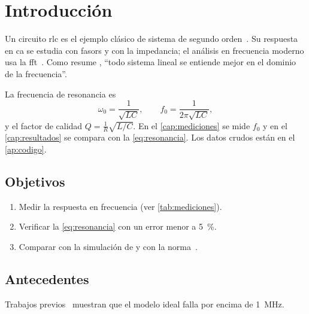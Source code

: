 \chapter{Introducción}\label{cap:intro}
Un circuito \gls{rlc} es el ejemplo clásico de sistema de segundo orden~\parencite{alexander2013,nilsson2015}.
Su respuesta en \gls{ca} se estudia con \glspl{fasor} y con la \gls{impedancia}; el análisis en
frecuencia moderno usa la \gls{fft}~\parencite{cooley1965}. Como resume \textcite{ogata2010},
\enquote{todo sistema lineal se entiende mejor en el dominio de la frecuencia}.

La frecuencia de \gls{resonancia} es
\begin{equation}\label{eq:resonancia}
  \omega_0 = \frac{1}{\sqrt{LC}}, \qquad f_0 = \frac{1}{2\pi\sqrt{LC}},
\end{equation}
%
%
%
%
y el factor de calidad $Q = \frac{1}{R}\sqrt{L/C}$. En el \cref{cap:mediciones} se mide $f_0$ y en el
\cref{cap:resultados} se compara con la \cref{eq:resonancia}. Los datos crudos están en el
\cref{ap:codigo}.

\section{Objetivos}
\begin{enumerate}
  \item Medir la respuesta en frecuencia (ver \cref{tab:mediciones}).
  \item Verificar la \cref{eq:resonancia} con un error menor a \SI{5}{\percent}.
  \item Comparar con la simulación de \textcite[cap.~14]{nilsson2015} y con la norma~\parencite{ieee1057}.
\end{enumerate}

\section{Antecedentes}
Trabajos previos~\parencite{tesisperez,datasheet} muestran que el modelo ideal falla por encima de
\SI{1}{\mega\hertz}.
